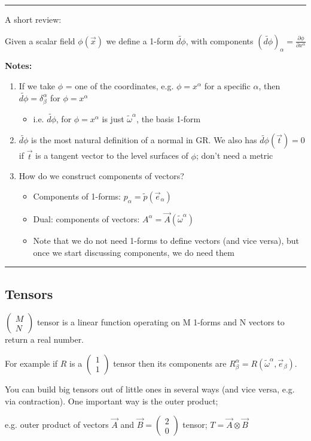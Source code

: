 \documentclass[a4paper]{article} %
\newcommand{\review}[1]
{
\hrule
A short review:

#1
\hrule
}
\newcommand{\pmx}[1]{
\begin{pmatrix}
#1
\end{pmatrix}
}
\renewcommand{\tilde}{\widetilde}
\begin{document}
\review{Given a scalar field $\phi(\vec{x})$ we define a 1-form $\tilde{d\phi}$, with components $(\tilde{d\phi})_{\alpha}=\frac{\partial\phi}{\partial x^{\alpha}}$

\textbf{Notes:}
\begin{enumerate}
\item If we take $\phi$ = one of the coordinates, e.g. $\phi=x^{\alpha}$ for a specific $\alpha$, then $\tilde{d\phi}=\delta^{\alpha}_{\beta}$ for $\phi=x^{\alpha}$
\begin{itemize}
\item i.e. $\tilde{d \phi}$, for $\phi=x^{\alpha}$ is just $\tilde{\omega}^{\alpha}$, the basis 1-form
\end{itemize}
\item $\tilde{d\phi}$ is the most natural definition of a normal in GR. We also has $\tilde{d\phi}(\vec{t})=0$ if $\vec{t}$ is a tangent vector to the level surfaces of $\phi$; don't need a metric
\item How do we construct components of vectors?
\begin{itemize}
\item Components of 1-forms: $p_{\alpha}=\tilde{p}(\vec{e}_{\alpha})$
\item Dual: components of vectors: $A^{\alpha}=\vec{A}(\tilde{\omega}^{\alpha})$
\item Note that we do not need 1-forms to define vectors (and vice versa), but once we start discussing components, we do need them
\end{itemize}
\end{enumerate}
}

\subsection{Tensors}
$\pmx{M\\N}$ tensor is a linear function operating on M 1-forms and N vectors to return a real number. 

For example if $R$ is a $\pmx{1\\1}$ tensor then its components are $R^{\alpha}_{\beta}=R(\tilde{\omega}^{\alpha},\vec{e}_{\beta})$.

You can build big tensors out of little ones in several ways (and vice versa, e.g. via contraction). One important way is the outer product; 

e.g. outer product of vectors $\vec{A}$ and $\vec{B}=\pmx{2\\0}$ tensor; $T=\vec{A}\otimes \vec{B}$
\end{document}
